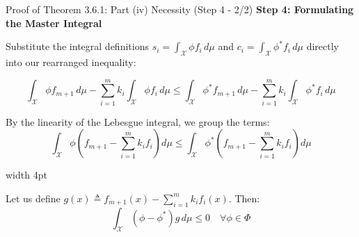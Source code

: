 \documentclass[10pt, aspectratio=169, xcolor=dvipsnames]{beamer}
\newcommand{\lead}[1]{{\color{UniBlue}\bfseries #1}}
\begin{document}
\begin{frame}{Proof of Theorem 3.6.1: Part (iv) Necessity (Step 4 - 2/2)}
    \lead{Step 4: Formulating the Master Integral}\\
    \vspace{0.2cm}
    
    Substitute the integral definitions $s_i = \int_{\mathcal{X}} \phi f_i \, d\mu$ and $c_i = \int_{\mathcal{X}} \phi^* f_i \, d\mu$ directly into our rearranged inequality:
    
    \vspace{-0.1cm}
    \[ \int_{\mathcal{X}} \phi f_{m+1} \, d\mu - \sum_{i=1}^m k_i \int_{\mathcal{X}} \phi f_i \, d\mu \le \int_{\mathcal{X}} \phi^* f_{m+1} \, d\mu - \sum_{i=1}^m k_i \int_{\mathcal{X}} \phi^* f_i \, d\mu \]
    
    \vspace{0.1cm}
    By the linearity of the Lebesgue integral, we group the terms:
    \[ \int_{\mathcal{X}} \phi \left( f_{m+1} - \sum_{i=1}^m k_i f_i \right) d\mu \le \int_{\mathcal{X}} \phi^* \left( f_{m+1} - \sum_{i=1}^m k_i f_i \right) d\mu \]
    
    \vspace{0.2cm}
    \noindent
    {\color{Teal}\vrule width 4pt}%
    \hspace{10pt}%
    \begin{minipage}{\dimexpr\textwidth-14pt\relax}
        \color{Slate}
        Let us define $g(x) \triangleq f_{m+1}(x) - \sum_{i=1}^m k_i f_i(x)$. Then:
        \[ \int_{\mathcal{X}} (\phi - \phi^*) g \, d\mu \le 0 \quad \forall \phi \in \Phi \]
    \end{minipage}
\end{frame}
\end{document}
